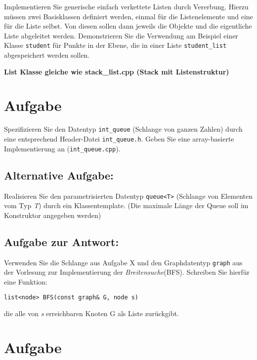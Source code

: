\documentclass[11pt,a4paper]{scrartcl}
\begin{document}
	Implementieren Sie generische einfach verkettete Listen durch Vererbung. Hierzu müssen zwei Basisklassen definiert werden, einmal für die Listenelemente und eine für die Liste selbst. Von diesen sollen dann jeweils die Objekte und die eigentliche Liste abgeleitet werden. Demonstrieren Sie die Verwendung am Beispiel einer Klasse \texttt{student} für Punkte in der Ebene, die in einer Liste \texttt{student\_list} abgespeichert werden sollen.
	
	\textbf{{\Large  List Klasse gleiche wie stack\_list.cpp (Stack mit Listenstruktur)}}
	
	
	
\section{Aufgabe}

Spezifizieren Sie den Datentyp \texttt{int\_queue} (Schlange von ganzen Zahlen) durch eine entsprechend Header-Datei \texttt{int\_queue.h}. Geben Sie eine array-basierte Implementierung an (\texttt{int\_queue.cpp}).
	
	
	
	\subsection{Alternative Aufgabe:}
	
	Realisieren Sie den parametrisierten Datentyp \texttt{queue<T>} (Schlange von Elementen vom Typ \textit{T}) durch ein Klassentemplate. (Die maximale Länge der Queue soll im Konstruktor angegeben werden)
	
	\subsection{Aufgabe zur Antwort:}
	
	Verwenden Sie die Schlange aus Aufgabe X und den Graphdatentyp \texttt{graph} aus der Vorlesung zur Implementierung der \textit{Breitensuche}(BFS). Schreiben Sie hierfür eine Funktion:
	\begin{center}
		\texttt{list<node> BFS(const graph\& G, node s)}
	\end{center}
	die alle von \textit{s} erreichbaren Knoten G als Liste zurückgibt.
	

\section{Aufgabe}
\end{document}
